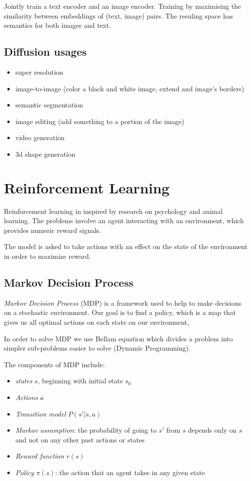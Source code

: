 \documentclass{article}
\begin{document}
Jointly train a text encoder and an image encoder. Training by
maximising the similarity between embeddings of (text, image) pairs. The
resuling space has semantics for both images and text.

\subsection{Diffusion usages}\label{diffusion-usages}

\begin{itemize}
\tightlist
\item
  super resolution
\item
  image-to-image (color a black and white image, extend and image's
  borders)
\item
  semantic segmentation
\item
  image editing (add something to a portion of the image)
\item
  video generation
\item
  3d shape generation
\end{itemize}

\section{Reinforcement Learning}\label{reinforcement-learning-1}

Reinforcement learning in inspired by research on psychology and animal
learning. The problems involve an agent interacting with an environment,
which provides numeric reward signals.

The model is asked to take actions with an effect on the state of the
environment in order to maximize reward.

\subsection{Markov Decision Process}\label{markov-decision-process}

\emph{Markov Decision Process} (MDP) is a framework used to help to make
decisions on a stochastic environment. Our goal is to find a policy,
which is a map that gives us all optimal actions on each state on our
environment,

In order to solve MDP we use Bellam equation which divides a problem
into simpler sub-problems easier to solve (Dynamic Programming).

The components of MDP include:

\begin{itemize}
\tightlist
\item
  \emph{states} \(s\), beginning with initial state \(s_0\)
\item
  \emph{Actions} \(a\)
\item
  \emph{Transition model} \(P(s'|s, a)\)
\item
  \emph{Markov assumption}: the probability of going to \(s'\) from
  \(s\) depends only on \(s\) and not on any other past actions or
  states
\item
  \emph{Reward function} \(r(s)\)
\item
  \emph{Policy} \(\pi(s)\): the action that an agent takes in any given
  state
\end{itemize}
\end{document}
